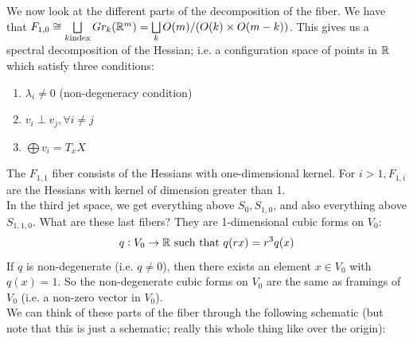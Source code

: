 \documentclass{article}
\newtheorem{proposed work}[theorem]{Proposed Work}
\theoremstyle{definition}
\begin{document}
We now look at the different parts of the decomposition of the fiber. We have that $F_{1,0}\cong \bigsqcup\limits_{k \text{index}} Gr_k(\mathbb R^m)=\bigsqcup\limits_{k}O(m)/(O(k)\times O(m-k))$. This gives us a spectral decomposition of the Hessian; i.e. a configuration space of points in $\mathbb R$ which satisfy three conditions:
\begin{enumerate}
\item $\lambda_i\neq 0$ (non-degeneracy condition)
\item $v_i\perp v_j, \forall i\neq j$
\item $\bigoplus v_i=T_xX$
\end{enumerate}
\begin{center}
\end{center}

The $F_{1,1}$ fiber consists of the Hessians with one-dimensional kernel. For $i>1, F_{1,i}$ are the Hessians with kernel of dimension greater than 1. \\

In the third jet space, we get everything above $S_0, S_{1,0}$, and also everything above $S_{1,1,0}$. What are these last fibers? They are 1-dimensional cubic forms on $V_0$: 
$$q:V_0\to \mathbb R \text{ such that } q(rx)=r^3q(x)$$
If $q$ is non-degenerate (i.e. $q\neq 0$), then there exists an element $x\in V_0$ with $q(x)=1$. So the non-degenerate cubic forms on $V_0$ are the same as framings of $V_0$ (i.e. a non-zero vector in $V_0$).\\

We can think of these parts of the fiber through the following schematic (but note that this is just a schematic; really this whole thing like over the origin):\\
\begin{center}
\end{center}
\end{document}
